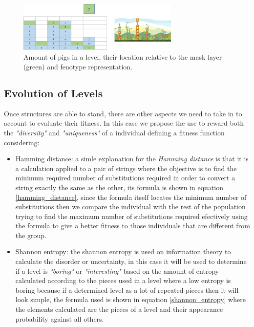 \documentclass[conference]{IEEEtran}
\begin{document}
    \begin{figure}[htbp]
        \centerline{\includegraphics[width=80mm]{Images/enemy_layer.png}}
        \caption{Amount of pigs in a level, their location relative to the mask layer
         (green) and fenotype representation.}
        \label{enemy_layer}
    \end{figure}
    
    \subsection{Evolution of Levels} 

    Once structures are able to stand, there are other aspects we need to take
    in to account to evaluate their fitness. In this case we propose the use to
    reward both the \textit{"diversity"} and \textit{"uniqueness"} of a
    individual defining a fitness function considering:
    
    \begin{itemize}
        \item Hamming distance: a simle explanation for the \textit{Hamming
        distance} is that it is a calculation applied to a pair of strings where the
        objective is to find the minimum required number of substitutions required in
        order to convert a string exactly the same as the other, its formula is
        shown in equation \ref{hamming_distance}, since the formula itself locates
        the minimum number of substitutions then we compare the individual
        with the rest of the population trying to find the maximum number of
        substitutions required efectively using the formula to give a better fitness
        to those individuals that are different from the group.
        \item Shannon entropy: the shannon entropy is used on information theory to
        calculate the disorder or uncertainty, in this case it will be used to
        determine if a level is \textit{"boring"} or \textit{"interesting"} based on
        the amount of entropy calculated according to the pieces used in a level
        where a low entropy is boring because if a determined level as a lot of
        repeated pieces then it will look simple, the formula used is shown in
        equation \ref{shannon_entropy} where the elements calculated are the pieces
        of a level and their appearance probability against all others.
    \end{itemize}
    
\end{document}
